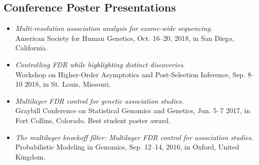 \documentclass[letterpaper]{article}
\begin{document}
\subsection*{Conference Poster Presentations}
\begin{itemize}\addtolength{\itemsep}{-0.2\baselineskip}

\item \textit{Multi-resolution association analysis for exome-wide sequencing.} \\ American Society for Human Genetics, Oct. 16--20, 2018, in San Diego, California.
\item \textit{Controlling FDR while highlighting distinct discoveries.} \\ Workshop on Higher-Order Asymptotics and Post-Selection Inference, Sep. 8--10 2018, in St. Louis, Missouri.
\item \textit{Multilayer FDR control for genetic association studies.} \\ Graybill Conference on Statistical Genomics and Genetics, Jun. 5--7 2017, in Fort Collins, Colorado. Best student poster award.
\item \textit{The multilayer knockoff filter: Multilayer FDR control for association studies.} \\ Probabilistic Modeling in Genomics, Sep. 12--14, 2016, in Oxford, United Kingdom.
\end{itemize}

\end{document}
